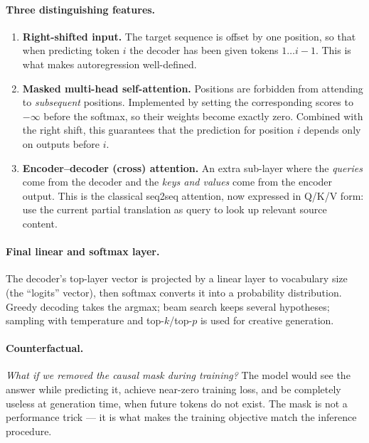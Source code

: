 \documentclass[11pt,a4paper]{article}
\begin{document}
\paragraph{Three distinguishing features.}
\begin{enumerate}
\item \textbf{Right-shifted input.} The target sequence is offset by one position, so that
  when predicting token $i$ the decoder has been given tokens $1 \ldots i-1$. This is what
  makes autoregression well-defined.
\item \textbf{Masked multi-head self-attention.} Positions are forbidden from attending to
  \emph{subsequent} positions. Implemented by setting the corresponding scores to $-\infty$
  before the softmax, so their weights become exactly zero. Combined with the right shift,
  this guarantees that the prediction for position $i$ depends only on outputs before $i$.
\item \textbf{Encoder--decoder (cross) attention.} An extra sub-layer where the \emph{queries}
  come from the decoder and the \emph{keys and values} come from the encoder output. This is
  the classical seq2seq attention, now expressed in Q/K/V form: use the current partial
  translation as query to look up relevant source content.
\end{enumerate}

\paragraph{Final linear and softmax layer.} The decoder's top-layer vector is projected by a
linear layer to vocabulary size (the ``logits'' vector), then softmax converts it into a
probability distribution. Greedy decoding takes the argmax; beam search keeps several
hypotheses; sampling with temperature and top-$k$/top-$p$ is used for creative generation.

\paragraph{Counterfactual.} \emph{What if we removed the causal mask during training?} The
model would see the answer while predicting it, achieve near-zero training loss, and be
completely useless at generation time, when future tokens do not exist. The mask is not a
performance trick --- it is what makes the training objective match the inference procedure.
\end{document}
